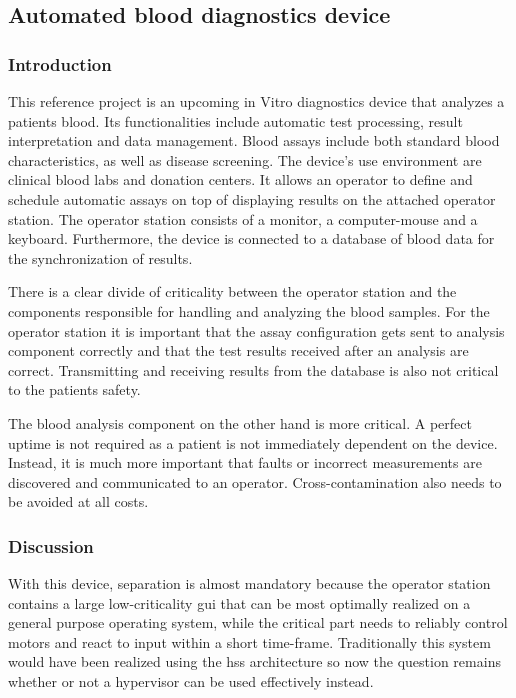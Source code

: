 \subsection{Automated blood diagnostics device}
\subsubsection{Introduction}
This reference project is an upcoming in Vitro diagnostics device that analyzes a patients blood. Its functionalities include automatic test processing, result interpretation and data management. Blood assays include both standard blood characteristics, as well as disease screening.
The device's use environment are clinical blood labs and donation centers. It allows an operator to define and schedule automatic assays on top of displaying results on the attached operator station. The operator station consists of a monitor, a computer-mouse and a keyboard. Furthermore, the device is connected to a database of blood data for the synchronization of results.

There is a clear divide of criticality between the operator station and the components responsible for handling and analyzing the blood samples. For the operator station it is important that the assay configuration gets sent to analysis component correctly and that the test results received after an analysis are correct. Transmitting and receiving results from the database is also not critical to the patients safety.

The blood analysis component on the other hand is more critical. A perfect uptime is not required as a patient is not immediately dependent on the device. Instead, it is much more important that faults or incorrect measurements are discovered and communicated to an operator. Cross-contamination also needs to be avoided at all costs.

\subsubsection{Discussion}
With this device, separation is almost mandatory because the operator station contains a large low-criticality \acrshort{gui} that can be most optimally realized on a general purpose operating system, while the critical part needs to reliably control motors and react to input within a short time-frame. Traditionally this system would have been realized using the \acrshort{hss} architecture so now the question remains whether or not a hypervisor can be used effectively instead.

